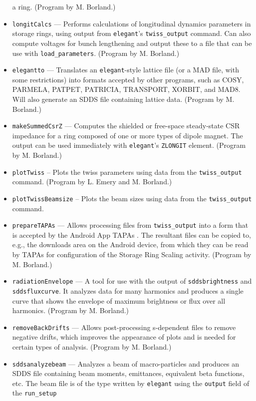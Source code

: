 \documentclass[11pt]{article}
\begin{document}
\begin{itemize}
  a ring. (Program by M. Borland.)
\item {\tt longitCalcs} --- Performs calculations of longitudinal dynamics parameters in storage rings,
  using output from \verb|elegant|'s \verb|twiss_output| command. Can also compute voltages for
  bunch lengthening and output these to a file that can be use with \verb|load_parameters|.
  (Program by M. Borland.)
\item {\tt elegantto} --- Translates an {\tt elegant}-style lattice file (or a MAD file, with
        some restrictions) into formats accepted by other programs, such as COSY, PARMELA, 
        PATPET, PATRICIA, TRANSPORT, XORBIT, and MAD8.  Will also generate an SDDS file containing lattice
        data.  (Program by M. Borland.)
\item {\tt makeSummedCsrZ} --- Computes the shielded or free-space steady-state CSR impedance for a ring
  composed of one or more types of dipole magnet.
 The output can be used immediately with {\tt elegant}'s \verb|ZLONGIT| element.
  (Program by M. Borland.)
\item {\tt plotTwiss} -- Plots the twiss parameters using data from the \verb|twiss_output| command.
  (Program by L. Emery and M. Borland.)
\item {\tt plotTwissBeamsize} -- Plots the beam sizes using data from the \verb|twiss_output| command.
\item {\tt prepareTAPAs} --- Allows processing files from \verb|twiss_output| into a form
  that is accepted by the Android App TAPAs \cite{TAPAs}. The resultant files can be copied to, e.g., 
  the downloads area on the Android device, from which they can be read by TAPAs for configuration of
  the Storage Ring Scaling activity.
  (Program by M. Borland.)
\item {\tt radiationEnvelope} --- A tool for use with the output of {\tt sddsbrightness} and {\tt sddsfluxcurve}.
  It analyzes data for many harmonics and produces a single curve that shows the envelope of maximum
  brightness or flux over all harmonics.
  (Program by M. Borland.)
\item {\tt removeBackDrifts} --- Allows post-processing s-dependent files to remove negative drifts, which
  improves the appearance of plots and is needed for certain types of analysis.
  (Program by M. Borland.)
\item {\tt sddsanalyzebeam} --- Analyzes a beam of macro-particles and produces an SDDS file
        containing beam moments, emittances, equivalent beta functions, etc.  The beam file
        is of the type written by {\tt elegant} using the {\tt output} field of the {\tt run\_setup}

\end{itemize}
\end{document}
